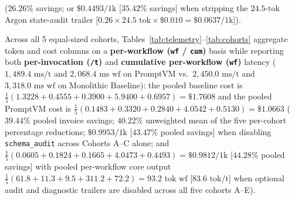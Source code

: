 \documentclass[conference,10pt]{IEEEtran}
\begin{document}
\begin{itemize}
($26.26\%$ savings; or $\$0.4493/\text{1k}$ [$35.42\%$ savings] when stripping the $24.5\text{-tok}$ Argon state-audit trailer [$0.26 \times 24.5\text{ tok} \times \$0.010 = \$0.0637/\text{1k}$]).
\end{itemize}
Across all 5 equal-sized cohorts, Tables~\ref{tab:telemetry}--\ref{tab:cohorts} aggregate token and cost columns on a \textbf{per-workflow (\texttt{wf} / \texttt{cum})} basis while reporting both \textbf{per-invocation (\texttt{/t})} and \textbf{cumulative per-workflow (\texttt{wf})} latency ($1{,}489.4\text{ ms/t}$ and $2{,}068.4\text{ ms wf}$ on PromptVM vs.\ $2{,}450.0\text{ ms/t}$ and $3{,}318.0\text{ ms wf}$ on Monolithic Baseline): the pooled baseline cost is $\frac{1}{5}(1.3228 + 0.4555 + 0.3900 + 5.9400 + 0.6957) = \$1.7608$ and the pooled PromptVM cost is $\frac{1}{5}(0.1483 + 0.3320 + 0.2840 + 4.0542 + 0.5130) = \$1.0663$ ($39.44\%$ pooled invoice savings; $40.22\%$ unweighted mean of the five per-cohort percentage reductions; $\$0.9953/\text{1k}$ [$43.47\%$ pooled savings] when disabling \texttt{schema\_audit} across Cohorts A--C alone; and $\frac{1}{5}(0.0605 + 0.1824 + 0.1665 + 4.0473 + 0.4493) = \$0.9812/\text{1k}$ [$44.28\%$ pooled savings] with pooled per-workflow core output $\frac{1}{5}(61.8 + 11.3 + 9.5 + 311.2 + 72.2) = 93.2\text{ tok wf}$ [$83.6\text{ tok/t}$] when optional audit and diagnostic trailers are disabled across all five cohorts A--E).
\end{document}

